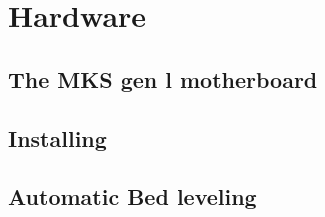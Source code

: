 \section{Hardware}

\subsection{The MKS gen l motherboard}

\subsection{Installing}

\subsection{Automatic Bed leveling}